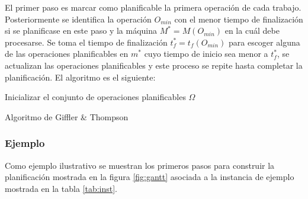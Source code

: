 El primer paso es marcar como planificable la primera operación de cada trabajo. Posteriormente se identifica la operación $O_{min}$ con el menor tiempo de finalización si se planificase en este paso y la máquina $M^*=M(O_{min})$ en la cuál debe procesarse. Se toma el tiempo de finalización $t^*_f = t_f(O_{min})$ para escoger alguna de las operaciones planificables en $m^*$ cuyo tiempo de inicio sea menor a $t^*_f$, se actualizan las operaciones planificables y este proceso se repite hasta completar la planificación. El algoritmo es el siguiente:\\ 

\begin{algorithm}[H]
 Inicializar el conjunto de operaciones planificables $\Omega$\;
    \label{alg:GT}
    \caption{Algoritmo de Giffler \& Thompson}
\end{algorithm}
\subsubsection*{Ejemplo}
Como ejemplo ilustrativo se muestran los primeros pasos para construir la planificación mostrada en la figura \ref{fig:gantt} asociada a la instancia de ejemplo mostrada en la tabla \ref{tab:inst}.\\

